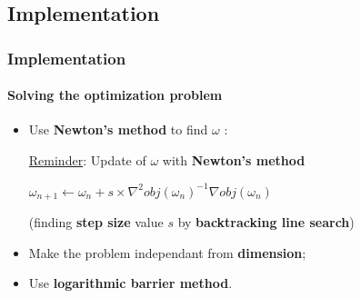 \documentclass{beamer}
\begin{document}
\subsection{Implementation}

\begin{frame}
\tableofcontents[currentsubsection]
\end{frame}

\begin{frame}
\frametitle{Implementation}
\framesubtitle{Solving the optimization problem}

\begin{itemize}
\item Use \textbf{Newton's method} to find $\omega$ :

\bigskip

\begin{block}{\underline{Reminder}: Update of $\omega$ with \textbf{Newton's method}}
          \begin{center}
          $\omega_{n+1} \leftarrow \omega_{n} + s \times \nabla^2 obj(\omega_n)^{-1}\nabla obj(\omega_n)$
          \end{center}

  (finding \textbf{step size} value $s$ by \textbf{backtracking line search})
\end{block}

\bigskip
\pause

\item Make the problem independant from \textbf{dimension};

\bigskip
\pause

\item Use \textbf{logarithmic barrier method}.

\end{itemize}

\end{frame}
\end{document}
